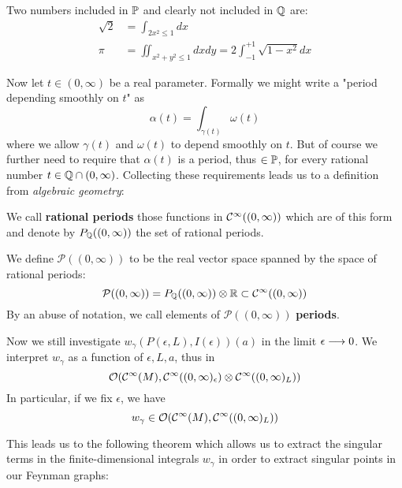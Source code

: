 \begin{example}
  Two numbers included in $\mathbb{P}$ and clearly not included in $\mathbb{Q}$ are:
  \begin{align}
    \sqrt{2} &= \int_{2x^2 \leq 1} dx \\
    \pi &= \iint_{x^2+y^2\leq 1} dx dy = 2 \int_{-1}^{+1} \sqrt{1-x^2} dx
  \end{align}
\end{example}

Now let $t \in (0, \infty)$ be a real parameter. Formally we might write a "period depending smoothly on $t$" as
\begin{equation} \alpha(t) = \int_{\gamma(t)} \omega(t)\end{equation}
where we allow $\gamma(t)$ and $\omega(t)$ to depend smoothly on $t$. But of course we further need to require that $\alpha(t)$ is a period, thus $\in \mathbb{P}$, for every rational number $t \in \mathbb{Q} \cap (0,\infty)$. Collecting these requirements leads us to a definition from \emph{algebraic geometry}:

\begin{definition}
  We call \textbf{rational periods} those functions in $\mathcal{C}^{\infty}((0,\infty))$ which are of this form and denote by $P_{\mathbb{Q}}((0,\infty))$ the set of rational periods.
\end{definition}

\begin{definition}
  We define $\mathcal{P}((0,\infty))$ to be the real vector space spanned by the space of rational periods:
  \begin{equation}\mathcal{P}((0,\infty)) = P_{\mathbb{Q}}((0,\infty)) \otimes \mathbb{R} \subset \mathcal{C}^{\infty}((0,\infty))\end{equation}
  By an abuse of notation, we call elements of $\mathcal{P}((0,\infty))$ \textbf{periods}.
\end{definition}

Now we still investigate $w_\gamma(P(\epsilon,L), I(\epsilon))(a)$ in the limit $\epsilon \lra 0$. We interpret $w_\gamma$ as a function of $\epsilon,L,a$, thus in
\begin{equation}
  \OO(\Ci(M), \Ci((0,\infty)_\epsilon) \otimes \Ci((0,\infty)_L))
\end{equation}
In particular, if we fix $\epsilon$, we have
\begin{equation} w_\gamma \in \mathcal{O}(\mathcal{C}^{\infty}(M), \mathcal{C}^{\infty}((0,\infty)_L))\end{equation}

This leads us to the following theorem which allows us to extract the singular terms in the finite-dimensional integrals $w_\gamma$ in order to extract singular points in our Feynman graphs:

